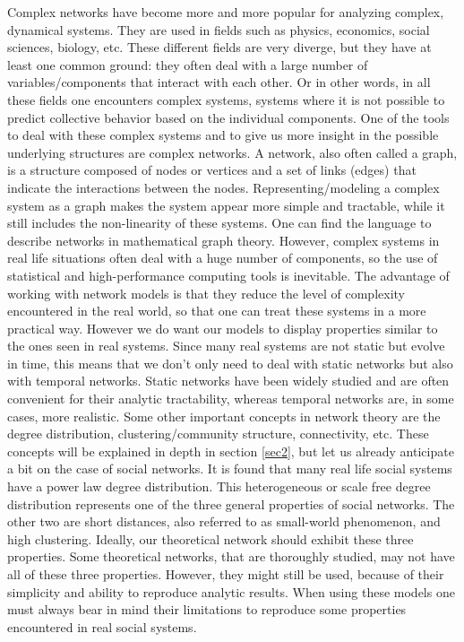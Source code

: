 \documentclass{article}
\begin{document}
Complex networks have become more and more popular for analyzing complex, dynamical systems. They are used in fields such as physics, economics, social sciences, biology, etc. These different fields are very diverge, but they have at least one common ground: they often deal with a large number of variables/components that interact with each other. Or in other words, in all these fields one encounters complex systems, systems where it is not possible to predict collective behavior based on the individual components. %
One of the tools to deal with these complex systems and to give us more insight in the possible underlying structures are complex networks. A network, also often called a graph, is a structure composed of nodes or vertices and a set of links (edges) that indicate the interactions between the nodes. Representing/modeling a complex system as a graph makes the system appear more simple and tractable, while it still includes the non-linearity of these systems. One can find the language to describe networks in mathematical graph theory. However, complex systems in real life situations often deal with a huge number of components, so the use of statistical and high-performance computing tools is inevitable. The advantage of working with network models is that they reduce the level of complexity encountered in the real world, so that one can treat these systems in a more practical way. However we do want our models to display properties similar to the ones seen in real systems. Since many real systems are not static but evolve in time, this means that we don't only need to deal with static networks but also with temporal networks. Static networks have been widely studied and are often convenient for their analytic tractability, whereas temporal networks are, in some cases, more realistic. Some other important concepts in network theory are the degree distribution, clustering/community structure, connectivity, etc. These concepts will be explained in depth in section \ref{sec2}, but let us already anticipate a bit on the case of social networks. It is found that many real life social systems have a power law degree distribution. This heterogeneous or scale free degree distribution represents one of the three general properties of social networks. The other two are short distances, also referred to as small-world phenomenon, and high clustering. %
Ideally, our theoretical network should exhibit these three properties. Some theoretical networks, that are thoroughly studied, may not have all of these three properties. However, they might still be used, because of their simplicity and ability to reproduce analytic results. When using these models one must always bear in mind their limitations to reproduce some properties encountered in real social systems.
\end{document}
